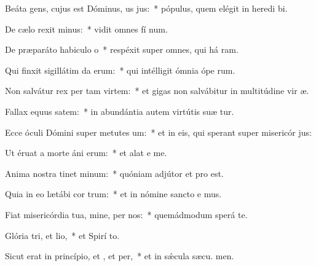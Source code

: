 \item Beáta gens, cujus est Dóminus, us jus:~* pópulus, quem elégit in heredi bi.
\item De cælo rexit minus:~* vidit omnes fí num.
\item De præparáto habiculo o~* respéxit super omnes, qui há ram.
\item Qui finxit sigillátim da erum:~* qui intélligit ómnia ópe rum.
\item Non salvátur rex per tam virtem:~* et gigas non salvábitur in multitúdine vir æ.
\item Fallax equus  satem:~* in abundántia autem virtútis suæ  tur.
\item Ecce óculi Dómini super metutes um:~* et in eis, qui sperant super misericór jus:
\item Ut éruat a morte áni erum:~* et alat e  me.
\item Anima nostra tinet minum:~* quóniam adjútor et pro  est.
\item Quia in eo lætábi cor trum:~* et in nómine sancto e mus.
\item Fiat misericórdia tua, mine, per nos:~* quemádmodum sperá  te.
\item Glória tri, et lio,~* et Spirí to.
\item Sicut erat in princípio, et , et per,~* et in sǽcula sæcu. men.
